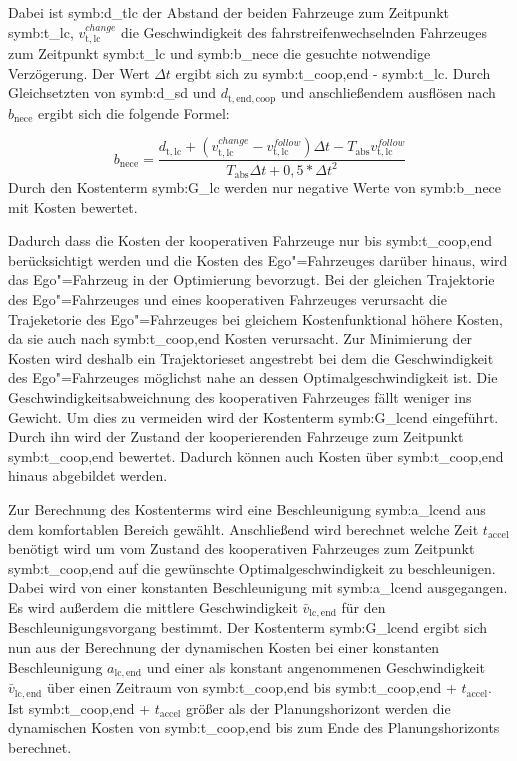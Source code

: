 Dabei ist \gls{symb:d_tlc} der Abstand der beiden Fahrzeuge zum Zeitpunkt \gls{symb:t_lc}, \(v_\mathrm{t,lc}^{change}\) die Geschwindigkeit des fahrstreifenwechselnden Fahrzeuges zum Zeitpunkt \gls{symb:t_lc} und \gls{symb:b_nece} die gesuchte notwendige Verz\"ogerung.
Der Wert \(\Delta t\)  ergibt sich zu \gls{symb:t_coop,end} - \gls{symb:t_lc}.
Durch Gleichsetzten von \gls{symb:d_sd} und \(d_\mathrm{t,end,coop}\) und anschlie{\ss}endem ausfl\"osen nach \(b_\mathrm{nece}\) ergibt sich die folgende Formel:

\begin{equation}
	b_\mathrm{nece} = \frac{d_\mathrm{t,lc} + \left( v_\mathrm{t,lc}^{change} - v_\mathrm{t,lc}^{follow} \right) \Delta t -    T_\mathrm{abs} v_\mathrm{t,lc}^{follow}}{T_\mathrm{abs}  \Delta t + 0,5 * \Delta t^2}
\end{equation}
Durch den Kostenterm \gls{symb:G_lc} werden nur negative Werte von \gls{symb:b_nece} mit Kosten bewertet.


Dadurch dass die Kosten der kooperativen Fahrzeuge nur bis \gls{symb:t_coop,end} ber\"ucksichtigt werden und die Kosten des Ego"=Fahrzeuges dar\"uber hinaus, wird das Ego"=Fahrzeug in der Optimierung bevorzugt.
Bei der gleichen Trajektorie des Ego"=Fahrzeuges und eines kooperativen Fahrzeuges verursacht die Trajeketorie des Ego"=Fahrzeuges bei gleichem Kostenfunktional h\"ohere Kosten, da sie auch nach \gls{symb:t_coop,end} Kosten verursacht.
Zur Minimierung der Kosten wird deshalb ein Trajektorieset angestrebt bei dem die Geschwindigkeit des Ego"=Fahrzeuges m\"oglichst nahe an dessen Optimalgeschwindigkeit ist.
Die Geschwindigkeitsabweichnung des kooperativen Fahrzeuges f\"allt weniger ins Gewicht.
Um dies zu vermeiden wird der Kostenterm \gls{symb:G_lcend} eingef\"uhrt.
Durch ihn wird der Zustand der kooperierenden Fahrzeuge zum Zeitpunkt \gls{symb:t_coop,end} bewertet.
Dadurch k\"onnen auch Kosten \"uber \gls{symb:t_coop,end} hinaus abgebildet werden.

Zur Berechnung des Kostenterms wird eine Beschleunigung \gls{symb:a_lcend} aus dem komfortablen Bereich gew\"ahlt.
Anschlie{\ss}end wird berechnet welche Zeit \(t_\mathrm{accel}\) ben\"otigt wird um vom Zustand des kooperativen Fahrzeuges zum Zeitpunkt \gls{symb:t_coop,end}  auf die gew\"unschte Optimalgeschwindigkeit zu beschleunigen.
Dabei wird von einer konstanten Beschleunigung mit \gls{symb:a_lcend} ausgegangen.
Es wird au{\ss}erdem die mittlere Geschwindigkeit \( \bar{v}_\mathrm{lc,end} \) f\"ur den Beschleunigungsvorgang bestimmt.
Der Kostenterm \gls{symb:G_lcend} ergibt sich nun aus der Berechnung der dynamischen Kosten bei einer konstanten Beschleunigung \(a_\mathrm{lc,end} \) und einer als konstant angenommenen Geschwindigkeit  \( \bar{v}_\mathrm{lc,end} \) \"uber einen Zeitraum von \gls{symb:t_coop,end} bis \gls{symb:t_coop,end} +  \( t_\mathrm{accel}\).
Ist  \gls{symb:t_coop,end} +  \(t_\mathrm{accel}\) gr\"o{\ss}er als der Planungshorizont werden die dynamischen Kosten von \gls{symb:t_coop,end} bis zum Ende des Planungshorizonts berechnet.


